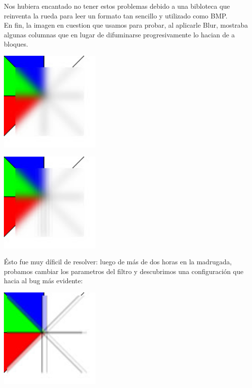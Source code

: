 \documentclass[10pt,a4paper,spanish]{article}
\begin{document}
Nos hubiera encantado no tener estos problemas debido a una bibloteca que reinventa la rueda para leer un formato tan sencillo y utilizado como BMP. \\

En fin, la imagen en cuestion que usamos para probar, al aplicarle Blur, mostraba algunas columnas que en lugar de difuminarse progresivamente lo hacian de a bloques. \\

\begin{center}\includegraphics[width=5cm, keepaspectratio]{molino-esperado.jpg}\end{center}
\begin{center}\includegraphics[width=5cm, keepaspectratio]{molino-sutil.jpg} \end{center}

Ésto fue muy díficil de resolver: luego de más de dos horas en la madrugada, probamos cambiar los parametros del filtro y descubrimos una configuración que hacia al bug más evidente: \\

\begin{center}\includegraphics[width=5cm, keepaspectratio]{molino-alevoso.jpg} \end{center}
\end{document}
